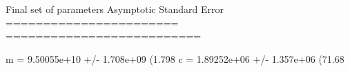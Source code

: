 Final set of parameters            Asymptotic Standard Error
=======================            ==========================

m               = 9.50055e+10      +/- 1.708e+09    (1.798%
c               = 1.89252e+06      +/- 1.357e+06    (71.68%
